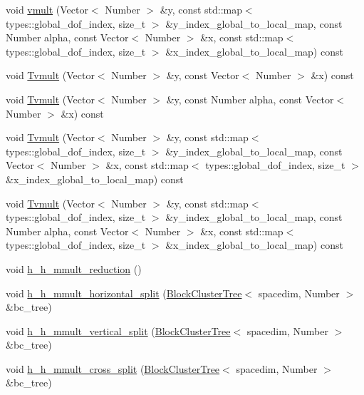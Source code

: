 \begin{DoxyCompactItemize}
\item 
void \hyperlink{classHMatrix_ab0a61c4d55a5d132b25589240be5c015}{vmult} (Vector$<$ Number $>$ \&y, const std\+::map$<$ types\+::global\+\_\+dof\+\_\+index, size\+\_\+t $>$ \&y\+\_\+index\+\_\+global\+\_\+to\+\_\+local\+\_\+map, const Number alpha, const Vector$<$ Number $>$ \&x, const std\+::map$<$ types\+::global\+\_\+dof\+\_\+index, size\+\_\+t $>$ \&x\+\_\+index\+\_\+global\+\_\+to\+\_\+local\+\_\+map) const
\item 
void \hyperlink{classHMatrix_a72e5255eb5ce46136d0e2b195c82f016}{Tvmult} (Vector$<$ Number $>$ \&y, const Vector$<$ Number $>$ \&x) const
\item 
void \hyperlink{classHMatrix_a46298efb74444db494068cc3fab73431}{Tvmult} (Vector$<$ Number $>$ \&y, const Number alpha, const Vector$<$ Number $>$ \&x) const
\item 
void \hyperlink{classHMatrix_a52a9fb807eab3f9f0903c03dd637382c}{Tvmult} (Vector$<$ Number $>$ \&y, const std\+::map$<$ types\+::global\+\_\+dof\+\_\+index, size\+\_\+t $>$ \&y\+\_\+index\+\_\+global\+\_\+to\+\_\+local\+\_\+map, const Vector$<$ Number $>$ \&x, const std\+::map$<$ types\+::global\+\_\+dof\+\_\+index, size\+\_\+t $>$ \&x\+\_\+index\+\_\+global\+\_\+to\+\_\+local\+\_\+map) const
\item 
void \hyperlink{classHMatrix_a9ce6e0dd7cfa3dc0fff165d6ed819017}{Tvmult} (Vector$<$ Number $>$ \&y, const std\+::map$<$ types\+::global\+\_\+dof\+\_\+index, size\+\_\+t $>$ \&y\+\_\+index\+\_\+global\+\_\+to\+\_\+local\+\_\+map, const Number alpha, const Vector$<$ Number $>$ \&x, const std\+::map$<$ types\+::global\+\_\+dof\+\_\+index, size\+\_\+t $>$ \&x\+\_\+index\+\_\+global\+\_\+to\+\_\+local\+\_\+map) const
\item 
void \hyperlink{classHMatrix_a168b6eea2e5b27528497850bf5ee2bbe}{h\+\_\+h\+\_\+mmult\+\_\+reduction} ()
\item 
void \hyperlink{classHMatrix_a38c88893c6ca784d4e56653d8b0e3e67}{h\+\_\+h\+\_\+mmult\+\_\+horizontal\+\_\+split} (\hyperlink{classBlockClusterTree}{Block\+Cluster\+Tree}$<$ spacedim, Number $>$ \&bc\+\_\+tree)
\item 
void \hyperlink{classHMatrix_a253c23d09e89a9a37a7d808374b5ae4e}{h\+\_\+h\+\_\+mmult\+\_\+vertical\+\_\+split} (\hyperlink{classBlockClusterTree}{Block\+Cluster\+Tree}$<$ spacedim, Number $>$ \&bc\+\_\+tree)
\item 
void \hyperlink{classHMatrix_ab315324e3ece178943f406823f792746}{h\+\_\+h\+\_\+mmult\+\_\+cross\+\_\+split} (\hyperlink{classBlockClusterTree}{Block\+Cluster\+Tree}$<$ spacedim, Number $>$ \&bc\+\_\+tree)

\end{DoxyCompactItemize}
